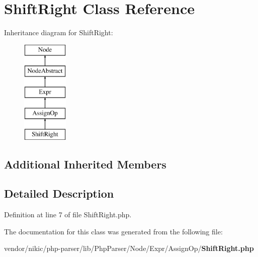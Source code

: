 \section{Shift\+Right Class Reference}
\label{class_php_parser_1_1_node_1_1_expr_1_1_assign_op_1_1_shift_right}
Inheritance diagram for Shift\+Right\+:\begin{figure}[H]
\begin{center}
\leavevmode
\includegraphics[height=5.000000cm]{class_php_parser_1_1_node_1_1_expr_1_1_assign_op_1_1_shift_right}
\end{center}
\end{figure}
\subsection*{Additional Inherited Members}


\subsection{Detailed Description}


Definition at line 7 of file Shift\+Right.\+php.



The documentation for this class was generated from the following file\+:\begin{DoxyCompactItemize}
\item 
vendor/nikic/php-\/parser/lib/\+Php\+Parser/\+Node/\+Expr/\+Assign\+Op/{\bf Shift\+Right.\+php}\end{DoxyCompactItemize}
